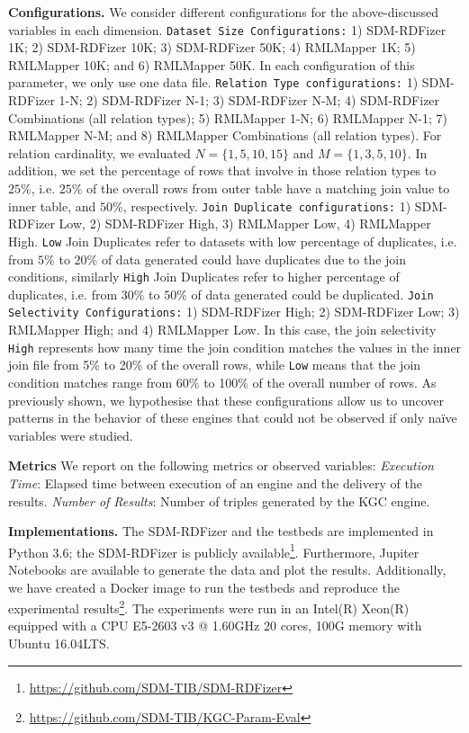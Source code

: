 \noindent \textbf{Configurations.}
We consider different configurations for the above-discussed variables in each dimension. 
%
\texttt{Dataset Size Configurations:} 1) SDM-RDFizer 1K; 2) SDM-RDFizer 10K; 3) SDM-RDFizer 50K; 4) RMLMapper 1K; 5) RML\-Mapper 10K; and 6) RMLMapper 50K. In each configuration of this parameter, we only use one data file.
%
\texttt{Relation Type configurations:} 1) SDM-RDFizer 1-N; 2) SDM-RDFizer N-1; 3) SDM-RDFizer N-M; 4) SDM-RDFizer Combinations (all relation types); 5) RMLMapper 1-N; 6) RMLMapper N-1; 7) RMLMapper N-M; and 8) RMLMapper Combinations (all relation types). For relation cardinality, we evaluated $N=\{1, 5, 10, 15\}$ and $M=\{1, 3, 5, 10\}$. In addition, we set the percentage of rows that involve in those relation types to $25\%$, i.e. $25\%$ of the overall rows from outer table have a matching join value to inner table, and $50\%$, respectively.
%
\texttt{Join Duplicate configurations:}  1) SDM-RDFizer Low, 2) SDM-RDFizer High, 3) RMLMapper Low, 4) RMLMapper High. \texttt{Low} Join Duplicates refer to datasets with low percentage of duplicates, i.e. from $5\%$ to $20\%$ of data generated could have duplicates due to the join conditions, similarly 
\texttt{High} Join Duplicates refer to higher percentage of duplicates, i.e. from $30\%$ to $50\%$ of data generated could be duplicated. 
%
\texttt{Join Selectivity Configurations:} 1) SDM-RDFizer High; 2) SDM-RDFizer Low; 3) RMLMapper High; and 4) RMLMapper Low. In this case, the join selectivity \texttt{High} represents how many time the join condition matches the values in the inner join file from 5\% to 20\% of the overall rows, while \texttt{Low} means that the join condition matches range from 60\% to 100\% of the overall number of rows. As previously shown, we hypothesise that these configurations allow us to uncover patterns in the behavior of these engines that could not be observed if only na{\"i}ve variables were studied. 

\noindent \textbf{Metrics}
We report on the following metrics or observed variables: 
\textit{Execution Time}: Elapsed time between execution of an engine and the delivery of the results.
\textit{Number of Results}: Number of triples generated by the KGC engine.

\noindent \textbf{Implementations.} 
The SDM-RDFizer and the testbeds are implemented in Python 3.6; the SDM-RDFizer is publicly available\footnote{\url{https://github.com/SDM-TIB/SDM-RDFizer}}. Furthermore, Jupiter Notebooks are available to generate the data and plot the results. Additionally, we have created a Docker image to run the testbeds and reproduce the experimental results\footnote{\url{https://github.com/SDM-TIB/KGC-Param-Eval}}. The experiments were run in an Intel(R) Xeon(R) equipped with a CPU E5-2603 v3 @ 1.60GHz 20 cores, 100G memory with Ubuntu 16.04LTS.


